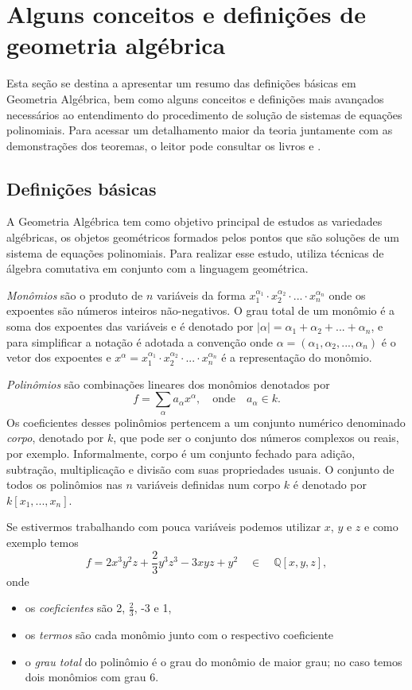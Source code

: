 \newpage
\section{Alguns conceitos e definições de geometria algébrica}\label{sec.geo-algebrica}

Esta seção se destina a apresentar um resumo das definições básicas em Geometria Algébrica, bem como alguns conceitos e definições mais avançados necessários ao entendimento do procedimento de solução de sistemas de equações polinomiais. Para acessar um detalhamento maior da teoria juntamente com as demonstrações dos teoremas, o leitor pode consultar os livros \citep{cox-using} e \citep{cox-ideals}.

\subsection*{Definições básicas}

A Geometria Algébrica tem como objetivo principal de estudos as variedades algébricas, os objetos geométricos
formados pelos pontos que são soluções de um sistema de equações polinomiais. Para realizar esse estudo, utiliza técnicas de álgebra comutativa em conjunto com a linguagem geométrica.

{\it Monômios} são o produto de $n$ variáveis da forma $x_1^{\alpha_1}\cdot x_2^{\alpha_2} \cdot ... \cdot x_n^{\alpha_n}$ onde os expoentes são números inteiros não-negativos. O grau total de um monômio é a soma dos expoentes das variáveis e é denotado por $|\alpha|=\alpha_1+\alpha_2+...+\alpha_n$, e para simplificar a notação é adotada a convenção onde $\alpha=(\alpha_1,\alpha_2,...,\alpha_n)$ é o vetor dos expoentes e $x^\alpha=x_1^{\alpha_1}\cdot x_2^{\alpha_2} \cdot ... \cdot x_n^{\alpha_n}$ é a representação do monômio.

{\it Polinômios} são combinações lineares dos monômios denotados por
\begin{equation*}
f=\sum_\alpha a_\alpha x^\alpha,\quad\text{onde}\quad a_\alpha\in k.
\end{equation*} 
Os coeficientes desses polinômios pertencem a um conjunto numérico denominado {\it corpo}, denotado por $k$, que pode ser o conjunto dos números complexos ou reais, por exemplo. Informalmente, corpo é um conjunto fechado para adição, subtração, multiplicação e divisão com suas propriedades usuais. O conjunto de todos os polinômios nas $n$ variáveis definidas num corpo $k$ é denotado por $k[x_1,...,x_n]$.

Se estivermos trabalhando com pouca variáveis podemos utilizar $x$, $y$ e $z$ e como exemplo temos
\begin{equation*}
f=2x^3y^2z+\frac{2}{3}y^3z^3-3xyz+y^2\quad\in\quad\mathbb{Q}[x,y,z],
\end{equation*} 
onde
\begin{itemize}
\item os {\it coeficientes} são 2, $\frac{2}{3}$, -3 e 1,
\item os {\it termos} são cada monômio junto com o respectivo coeficiente
\item o {\it grau total} do polinômio é o grau do monômio de maior grau; no caso temos dois monômios com grau 6.
\end{itemize}

